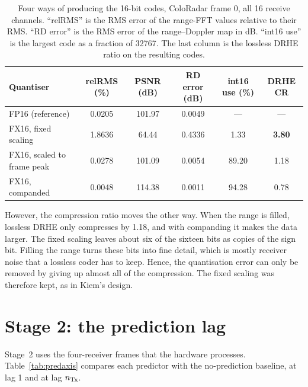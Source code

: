 \begin{table}[htbp]
\centering
\caption[Quantisation study]{Four ways of producing the 16-bit codes, ColoRadar
frame 0, all 16 receive channels. ``relRMS'' is the RMS error of the range-FFT
values relative to their RMS. ``RD error'' is the RMS error of the
range--Doppler map in dB. ``int16 use'' is the largest code as a fraction of
\num{32767}. The last column is the lossless DRHE ratio on the resulting codes.}
\label{tab:quant}
\small
\setlength{\tabcolsep}{3pt}
\begin{tabular}{l|c|c|c|c|c}
\textbf{Quantiser} & \textbf{relRMS (\%)} & \textbf{PSNR (dB)} & \textbf{RD error (dB)} & \textbf{int16 use (\%)} & \textbf{DRHE CR}\\
\hline
FP16 (reference)            & 0.0205 & 101.97 & 0.0049 & ---   & ---\\
FX16, fixed scaling         & 1.8636 & 64.44  & 0.4336 & 1.33  & \textbf{3.80}\\
FX16, scaled to frame peak  & 0.0278 & 101.09 & 0.0054 & 89.20 & 1.18\\
FX16, companded \cite{deng2024} & 0.0048 & 114.38 & 0.0011 & 94.28 & 0.78\\
\end{tabular}
\end{table}

However, the compression ratio moves the other way. When the range is filled,
lossless DRHE only compresses by \num{1.18}, and with companding it makes the
data larger. The fixed scaling leaves about six of the sixteen bits as copies
of the sign bit. Filling the range turns these bits into fine detail, which is
mostly receiver noise that a lossless coder has to keep. Hence, the
quantisation error can only be removed by giving up almost all of the
compression. The fixed scaling was therefore kept, as in Kiem's design.

\section{Stage 2: the prediction lag}
\label{sec:predaxisres}

Stage~2 uses the four-receiver frames that the hardware processes.
Table~\ref{tab:predaxis} compares each predictor with the no-prediction
baseline, at lag 1 and at lag $n_{\mathrm{Tx}}$.

